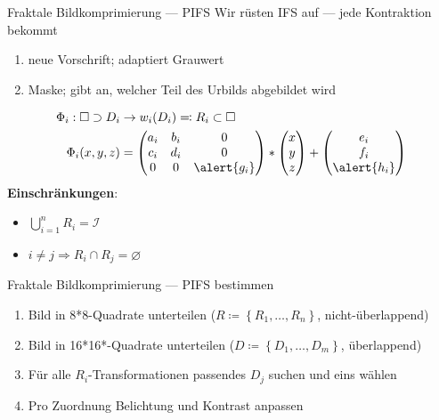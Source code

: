 \documentclass[10pt]{beamer}
\begin{document}
\begin{frame}{Fraktale Bildkomprimierung --- PIFS}
  Wir rüsten IFS auf --- jede Kontraktion bekommt
  \begin{enumerate}
    \item neue Vorschrift; adaptiert Grauwert
    \item Maske; gibt an, welcher Teil des Urbilds abgebildet wird
  \end{enumerate}
  \pause{}
  \begin{align*}
    \Phi_i: \square \supset D_i &\to w_i(D_i) \eqqcolon R_i \subset \square \\
    \Phi_i(x,y,z) &= \begin{pmatrix}
      a_i & b_i & 0 \\
      c_i & d_i & 0 \\
      0 & 0 & \alert{g_i}
    \end{pmatrix} * \begin{pmatrix}
      x \\ y \\ z
    \end{pmatrix} + \begin{pmatrix}
      e_i \\ f_i \\ \alert{h_i}
    \end{pmatrix}
  \end{align*}
  \textbf{Einschränkungen}:
  \begin{itemize}
    \item \( \bigcup_{i=1}^n R_i = \mathcal{I} \)
    \item \( i \neq j \Rightarrow R_i \cap R_j = \varnothing \)
  \end{itemize}
\end{frame}

\begin{frame}{Fraktale Bildkomprimierung --- PIFS bestimmen}
  \begin{enumerate}
    \item Bild in 8*8-Quadrate unterteilen (\( R \coloneqq \left \{ R_1, \dots, R_n \right \} \), nicht-überlappend)
    \item Bild in 16*16*-Quadrate unterteilen (\( D \coloneqq \left \{ D_1, \dots, D_m \right \} \), überlappend)
    \item Für alle \( R_i \)-Transformationen passendes \( D_j \) suchen und eins wählen
    \item Pro Zuordnung Belichtung und Kontrast anpassen
  \end{enumerate}
\end{frame}
\end{document}
